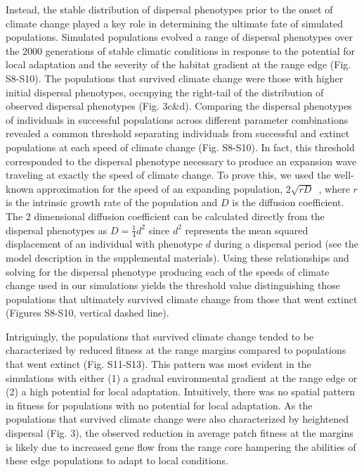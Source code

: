 \documentclass[12pt, oneside]{article}
\begin{document}
Instead, the stable distribution of dispersal phenotypes prior to the onset of climate change played a key role in determining the ultimate fate of simulated populations. Simulated populations evolved a range of dispersal phenotypes over the $2000$ generations of stable climatic conditions in response to the potential for local adaptation and the severity of the habitat gradient at the range edge (Fig. S8-S10). The populations that survived climate change were those with higher initial dispersal phenotypes, occupying the right-tail of the distribution of observed dispersal phenotypes (Fig. 3c\&d). Comparing the dispersal phenotypes of individuals in successful populations across different parameter combinations revealed a common threshold separating individuals from successful and extinct populations at each speed of climate change (Fig. S8-S10). In fact, this threshold corresponded to the dispersal phenotype necessary to produce an expansion wave traveling at exactly the speed of climate change. To prove this, we used the well-known approximation for the speed of an expanding population, $2\sqrt{rD}$~\citep{hastings2005spatial}, where $r$ is the intrinsic growth rate of the population and $D$ is the diffusion coefficient. The $2$ dimensional diffusion coefficient can be calculated directly from the dispersal phenotypes as $D=\frac{1}{4}d^{2}$ since $d^{2}$ represents the mean squared displacement of an individual with phenotype $d$ during a dispersal period (see the model description in the supplemental materials). Using these relationships and solving for the dispersal phenotype producing each of the speeds of climate change used in our simulations yields the threshold value distinguishing those populations that ultimately survived climate change from those that went extinct (Figures S8-S10, vertical dashed line). 

Intriguingly, the populations that survived climate change tended to be characterized by reduced fitness at the range margins compared to populations that went extinct (Fig. S11-S13). This pattern was most evident in the simulations with either (1) a gradual environmental gradient at the range edge or (2) a high potential for local adaptation. Intuitively, there was no spatial pattern in fitness for populations with no potential for local adaptation. As the populations that survived climate change were also characterized by heightened dispersal (Fig. 3), the observed reduction in average patch fitness at the margins is likely due to increased gene flow from the range core hampering the abilities of these edge populations to adapt to local conditions.
\end{document}
